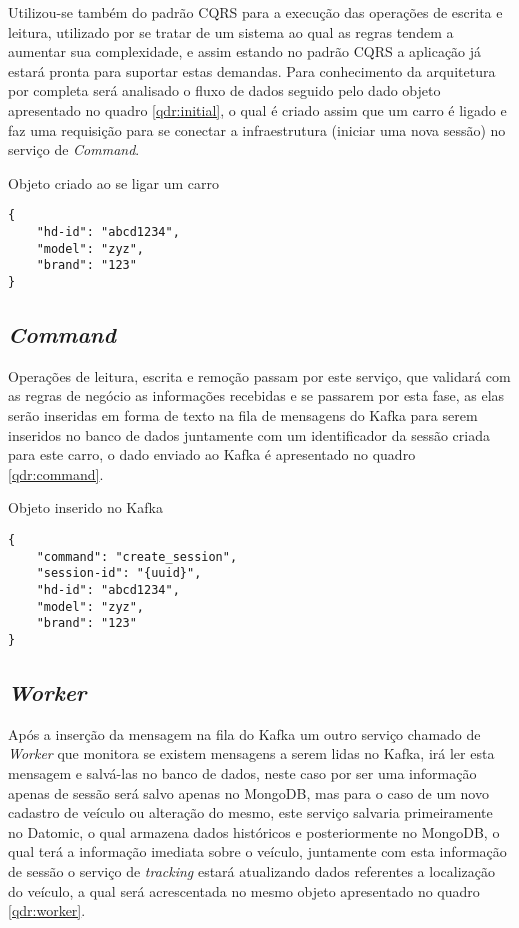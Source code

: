 Utilizou-se também do padrão CQRS para a execução das operações de escrita e leitura, utilizado por se tratar de um sistema ao qual as regras tendem a aumentar sua complexidade, e assim estando no padrão CQRS a aplicação já estará pronta para suportar estas demandas. Para conhecimento da arquitetura por completa será analisado o fluxo de dados seguido pelo dado objeto apresentado no quadro \ref{qdr:initial}, o qual é criado assim que um carro é ligado e faz uma requisição para se conectar a infraestrutura (iniciar uma nova sessão) no serviço de \textit{Command}.

\begin{quadro}
\caption{\label{qdr:initial}Objeto criado ao se ligar um carro}
\begin{lstlisting}
{
	"hd-id": "abcd1234",
	"model": "zyz",
	"brand": "123"
}
\end{lstlisting}
\end{quadro}

\subsection{\textit{Command}}
Operações de leitura, escrita e remoção passam por este serviço, que validará com as regras de negócio as informações recebidas e se passarem por esta fase, as elas serão inseridas em forma de texto na fila de mensagens do Kafka para serem inseridos no banco de dados juntamente com um identificador da sessão criada para este carro, o dado enviado ao Kafka é apresentado no quadro \ref{qdr:command}.

\begin{quadro}
\caption{\label{qdr:command}Objeto inserido no Kafka}
\begin{lstlisting}
{
	"command": "create_session",
	"session-id": "{uuid}",
	"hd-id": "abcd1234",
	"model": "zyz",
	"brand": "123"
}
\end{lstlisting}
\end{quadro}

\subsection{\textit{Worker}}
Após a inserção da mensagem na fila do Kafka um outro serviço chamado de \textit{Worker} que monitora se existem mensagens a serem lidas no Kafka, irá ler esta mensagem e salvá-las no banco de dados, neste caso por ser uma informação apenas de sessão será salvo apenas no MongoDB, mas para o caso de um novo cadastro de veículo ou alteração do mesmo, este serviço salvaria primeiramente no Datomic, o qual armazena dados históricos e posteriormente no MongoDB, o qual terá a informação imediata sobre o veículo, juntamente com esta informação de sessão o serviço de \textit{tracking} estará atualizando dados referentes a localização do veículo, a qual será acrescentada no mesmo objeto apresentado no quadro \ref{qdr:worker}. 

